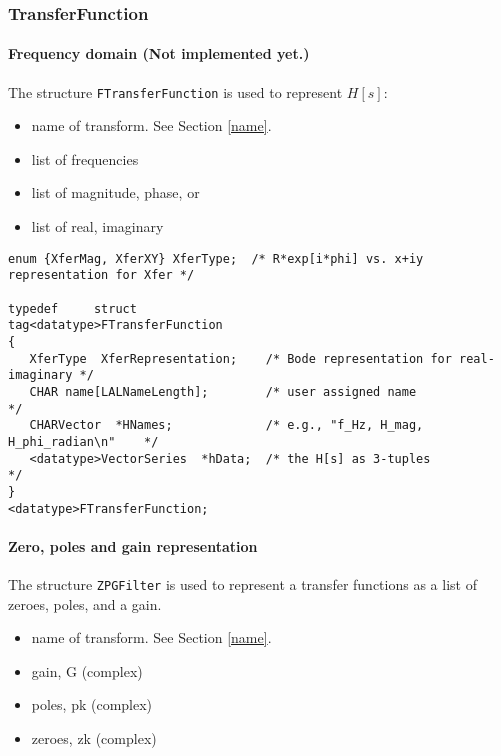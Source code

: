 \documentclass[]{ligodcc}
\renewcommand{\texttt}[1]{{\ttfamily\color{blue}#1}}
\begin{document}
\subsubsection{{\texttt {TransferFunction}}}

\paragraph{Frequency domain   {\bf (Not implemented yet.)} \\}

The structure {\tt FTransferFunction} is used to represent $H[s]$:

\begin{itemize}
\vspace{-0.1in}
\item
name of transform.  See Section \ref{name}.
\vspace{-0.1in}
\item
list of frequencies
\vspace{-0.1in}
\item
list of magnitude, phase, or
\vspace{-0.1in}
\item
list of real, imaginary
\end{itemize}


{\footnotesize
\begin{verbatim}
enum {XferMag, XferXY} XferType;  /* R*exp[i*phi] vs. x+iy representation for Xfer */

typedef		struct 			
tag<datatype>FTransferFunction
{
   XferType  XferRepresentation;    /* Bode representation for real-imaginary */
   CHAR name[LALNameLength];        /* user assigned name                     */
   CHARVector  *HNames;             /* e.g., "f_Hz, H_mag, H_phi_radian\n"    */
   <datatype>VectorSeries  *hData;  /* the H[s] as 3-tuples                   */
}
<datatype>FTransferFunction;
\end{verbatim}}

\paragraph{Zero, poles and gain representation \\}

The structure {\tt ZPGFilter} is used to represent a transfer functions as a
list of zeroes, poles, and a gain.


\begin{itemize}
\vspace{-0.1in}
\item
name of transform. See Section \ref{name}.
\vspace{-0.1in}
\item
gain, G (complex)
\vspace{-0.1in}
\item
poles, pk (complex)
\vspace{-0.1in}
\item
zeroes, zk (complex)
\end{itemize}
\end{document}
